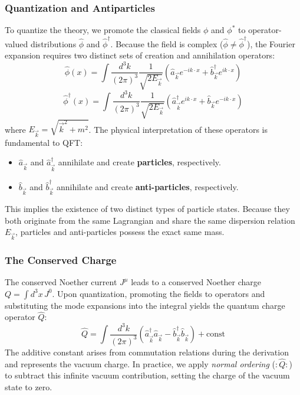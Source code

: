 \subsubsection{Quantization and Antiparticles}

To quantize the theory, we promote the classical fields \(\phi\) and \(\phi^*\) to operator-valued distributions \(\hat{\phi}\) and \(\hat{\phi}^\dagger\). Because the field is complex (\(\hat{\phi} \neq \hat{\phi}^\dagger\)), the Fourier expansion requires two distinct sets of creation and annihilation operators:
\[
    \hat{\phi}(x) = \int \frac{d^3k}{(2\pi)^3} \frac{1}{\sqrt{2E_{\vec{k}}}} \left( \hat{a}_{\vec{k}} e^{-ik \cdot x} + \hat{b}_{\vec{k}}^\dagger e^{ik \cdot x} \right)
\]
\[
    \hat{\phi}^\dagger(x) = \int \frac{d^3k}{(2\pi)^3} \frac{1}{\sqrt{2E_{\vec{k}}}} \left( \hat{a}_{\vec{k}}^\dagger e^{ik \cdot x} + \hat{b}_{\vec{k}} e^{-ik \cdot x} \right)
\]
where \(E_{\vec{k}} = \sqrt{\vec{k}^2 + m^2}\).
The physical interpretation of these operators is fundamental to QFT:
\begin{itemize}
    \item \(\hat{a}_{\vec{k}}\) and \(\hat{a}_{\vec{k}}^\dagger\) annihilate and create \textbf{particles}, respectively.
    \item \(\hat{b}_{\vec{k}}\) and \(\hat{b}_{\vec{k}}^\dagger\) annihilate and create \textbf{anti-particles}, respectively.
\end{itemize}
This implies the existence of two distinct types of particle states. Because they both originate from the same Lagrangian and share the same dispersion relation \(E_{\vec{k}}\), particles and anti-particles possess the exact same mass.

\subsubsection{The Conserved Charge}

The conserved Noether current \(J^\mu\) leads to a conserved Noether charge \(Q = \int d^3x \, J^0\). Upon quantization, promoting the fields to operators and substituting the mode expansions into the integral yields the quantum charge operator \(\hat{Q}\):
\[
    \hat{Q} = \int \frac{d^3k}{(2\pi)^3} \left( \hat{a}_{\vec{k}}^\dagger \hat{a}_{\vec{k}} - \hat{b}_{\vec{k}}^\dagger \hat{b}_{\vec{k}} \right) + \text{const}
\]
The additive constant arises from commutation relations during the derivation and represents the vacuum charge. In practice, we apply \textit{normal ordering} (\(:\hat{Q}:\)) to subtract this infinite vacuum contribution, setting the charge of the vacuum state to zero.

